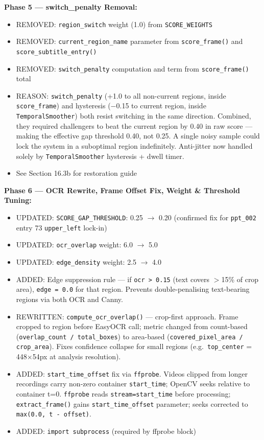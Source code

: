 \documentclass[11pt]{article}
\begin{document}
\textbf{Phase 5 --- switch\_penalty Removal:}
\begin{itemize}[leftmargin=1.2em]
    \item REMOVED: \texttt{region\_switch} weight (1.0) from \texttt{SCORE\_WEIGHTS}
    \item REMOVED: \texttt{current\_region\_name} parameter from \texttt{score\_frame()} and \texttt{score\_subtitle\_entry()}
    \item REMOVED: \texttt{switch\_penalty} computation and term from \texttt{score\_frame()} total
    \item REASON: \texttt{switch\_penalty} (+1.0 to all non-current regions, inside \texttt{score\_frame}) and hysteresis ($-$0.15 to current region, inside \texttt{TemporalSmoother}) both resist switching in the same direction. Combined, they required challengers to beat the current region by 0.40 in raw score — making the effective gap threshold 0.40, not 0.25. A single noisy sample could lock the system in a suboptimal region indefinitely. Anti-jitter now handled solely by \texttt{TemporalSmoother} hysteresis + dwell timer.
    \item See Section 16.3b for restoration guide
\end{itemize}

\textbf{Phase 6 --- OCR Rewrite, Frame Offset Fix, Weight \& Threshold Tuning:}
\begin{itemize}[leftmargin=1.2em]
    \item UPDATED: \texttt{SCORE\_GAP\_THRESHOLD}: 0.25 $\rightarrow$ 0.20 (confirmed fix for \texttt{ppt\_002} entry 73 \texttt{upper\_left} lock-in)
    \item UPDATED: \texttt{ocr\_overlap} weight: 6.0 $\rightarrow$ 5.0
    \item UPDATED: \texttt{edge\_density} weight: 2.5 $\rightarrow$ 4.0
    \item ADDED: Edge suppression rule --- if \texttt{ocr > 0.15} (text covers $>$15\% of crop area), \texttt{edge = 0.0} for that region. Prevents double-penalising text-bearing regions via both OCR and Canny.
    \item REWRITTEN: \texttt{compute\_ocr\_overlap()} --- crop-first approach. Frame cropped to region before EasyOCR call; metric changed from count-based (\texttt{overlap\_count / total\_boxes}) to area-based (\texttt{covered\_pixel\_area / crop\_area}). Fixes confidence collapse for small regions (e.g.\ \texttt{top\_center} = 448$\times$54px at analysis resolution).
    \item ADDED: \texttt{start\_time\_offset} fix via \texttt{ffprobe}. Videos clipped from longer recordings carry non-zero container \texttt{start\_time}; OpenCV seeks relative to container t=0. \texttt{ffprobe} reads \texttt{stream=start\_time} before processing; \texttt{extract\_frame()} gains \texttt{start\_time\_offset} parameter; seeks corrected to \texttt{max(0.0, t - offset)}.
    \item ADDED: \texttt{import subprocess} (required by ffprobe block)
\end{itemize}
\end{document}
